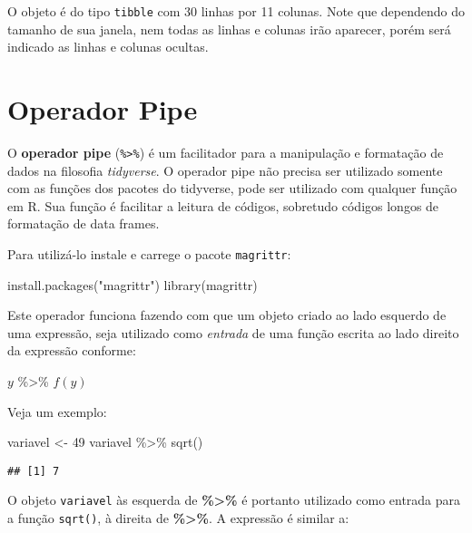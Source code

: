\documentclass[
]{book}
\newenvironment{Shaded}{\begin{snugshade}}{\end{snugshade}}
\newcommand{\DecValTok}[1]{\textcolor[rgb]{0.00,0.00,0.81}{#1}}
\newcommand{\FunctionTok}[1]{\textcolor[rgb]{0.00,0.00,0.00}{#1}}
\newcommand{\NormalTok}[1]{#1}
\newcommand{\OtherTok}[1]{\textcolor[rgb]{0.56,0.35,0.01}{#1}}
\newcommand{\SpecialCharTok}[1]{\textcolor[rgb]{0.00,0.00,0.00}{#1}}
\newcommand{\StringTok}[1]{\textcolor[rgb]{0.31,0.60,0.02}{#1}}
\begin{document}
O objeto é do tipo \texttt{tibble} com 30 linhas por 11 colunas. Note que dependendo do tamanho de sua janela, nem todas as linhas e colunas irão aparecer, porém será indicado as linhas e colunas ocultas.

\hypertarget{pipe}{%
\chapter{Operador Pipe}\label{pipe}}

O \textbf{operador pipe} (\texttt{\%\textgreater{}\%}) é um facilitador para a manipulação e formatação de dados na filosofia \emph{tidyverse}. O operador pipe não precisa ser utilizado somente com as funções dos pacotes do tidyverse, pode ser utilizado com qualquer função em R. Sua função é facilitar a leitura de códigos, sobretudo códigos longos de formatação de data frames.

Para utilizá-lo instale e carrege o pacote \texttt{magrittr}:

\begin{Shaded}
\begin{Highlighting}[]
\FunctionTok{install.packages}\NormalTok{(}\StringTok{"magrittr"}\NormalTok{)}
\FunctionTok{library}\NormalTok{(magrittr)}
\end{Highlighting}
\end{Shaded}

Este operador funciona fazendo com que um objeto criado ao lado esquerdo de uma expressão, seja utilizado como \emph{entrada} de uma função escrita ao lado direito da expressão conforme:

\(y\) \%\textgreater\% \(f(y)\)

Veja um exemplo:

\begin{Shaded}
\begin{Highlighting}[]
\NormalTok{variavel }\OtherTok{\textless{}{-}} \DecValTok{49}
\NormalTok{variavel }\SpecialCharTok{\%\textgreater{}\%} \FunctionTok{sqrt}\NormalTok{()}
\end{Highlighting}
\end{Shaded}

\begin{verbatim}
## [1] 7
\end{verbatim}

O objeto \texttt{variavel} às esquerda de \textbf{\%\textgreater\%} é portanto utilizado como entrada para a função \texttt{sqrt()}, à direita de \textbf{\%\textgreater\%}. A expressão é similar a:
\end{document}
